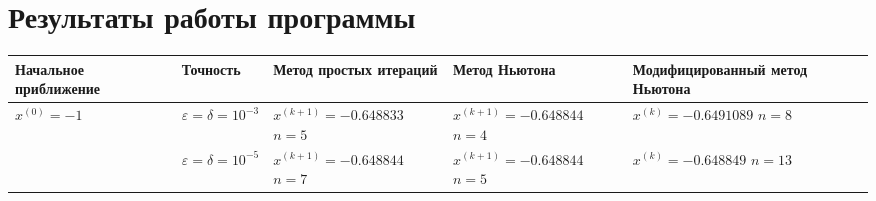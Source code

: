 \section{Результаты работы программы}

\begin{table}[h!]
	\begin{tabular}{|p{12ex}|l|p{20ex}|p{20ex}|p{20ex}|}
		\hline
		Начальное приближение                    & Точность                            & Метод простых итераций & Метод Ньютона & Модифицированный метод Ньютона \\ \hline
		\(x^{(0)} = -1 \)                        &                                                                                                               %
		\(\varepsilon = \delta = 10^{-3} \)      &                                                                                                               %
		\(x^{(k+1)}=-0.648833\) \newline \(n=5\) &                                                                                                               %
		\(x^{(k+1)}=-0.648844\) \newline \(n=4\) &                                                                                                               %
		\(x^{(k)}=-0.6491089\) \newline \(n=8\)                                                                                                                  \\ \cline{2-5}
		                                         & \(\varepsilon = \delta = 10^{-5} \) &                                                                         %
		\(x^{(k+1)}=-0.648844\) \newline \(n=7\) &                                                                                                               %
		\(x^{(k+1)}=-0.648844\) \newline \(n=5\) &                                                                                                               %
		\(x^{(k)}=-0.648849\) \newline \(n=13\)                                                                                                                  \\ \hline


\end{tabular}
\end{table}
